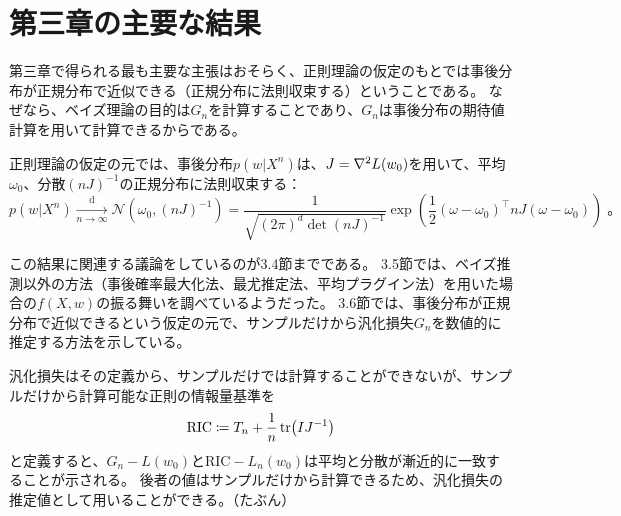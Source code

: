 \documentclass[dvipdfmx]{jsarticle}
\begin{document}
\section{第三章の主要な結果}
第三章で得られる最も主要な主張はおそらく、正則理論の仮定のもとでは事後分布が正規分布で近似できる（正規分布に法則収束する）ということである。
なぜなら、ベイズ理論の目的は$G_n$を計算することであり、$G_n$は事後分布の期待値計算を用いて計算できるからである。
\begin{mybox}[事後分布が正規分布に法則収束する]
    正則理論の仮定の元では、事後分布$p(w|X^n)$は、$J=\laplacian L(w_0)$を用いて、平均$\omega_0$、分散$(nJ)^{-1}$の正規分布に法則収束する：
\begin{equation}
    p(w|X^n) \xrightarrow[n\to\infty]{\mathrm{d}} \mathcal{N}(\omega_0, (nJ)^{-1})
    = \frac{1}{\sqrt{(2\pi)^{d}\det{(nJ)^{-1}}}}\exp(\frac{1}{2}(\omega-\omega_0)^{\top}nJ(\omega-\omega_0))\;。
\end{equation}
\end{mybox}
この結果に関連する議論をしているのが3.4節までである。
3.5節では、ベイズ推測以外の方法（事後確率最大化法、最尤推定法、平均プラグイン法）を用いた場合の$f(X,w)$の振る舞いを調べているようだった。
3.6節では、事後分布が正規分布で近似できるという仮定の元で、サンプルだけから汎化損失$G_n$を数値的に推定する方法を示している。

\begin{mybox}[サンプルだけから汎化損失を推定する]
    汎化損失はその定義から、サンプルだけでは計算することができないが、サンプルだけから計算可能な正則の情報量基準を
    \begin{equation}
        \text{RIC} \coloneqq T_n + \frac{1}{n}\tr(IJ^{-1})
    \end{equation}
    と定義すると、$G_n - L(w_0)$と$\text{RIC} - L_n(w_0)$は平均と分散が漸近的に一致することが示される。
    後者の値はサンプルだけから計算できるため、汎化損失の推定値として用いることができる。（たぶん）
\end{mybox}
\end{document}

